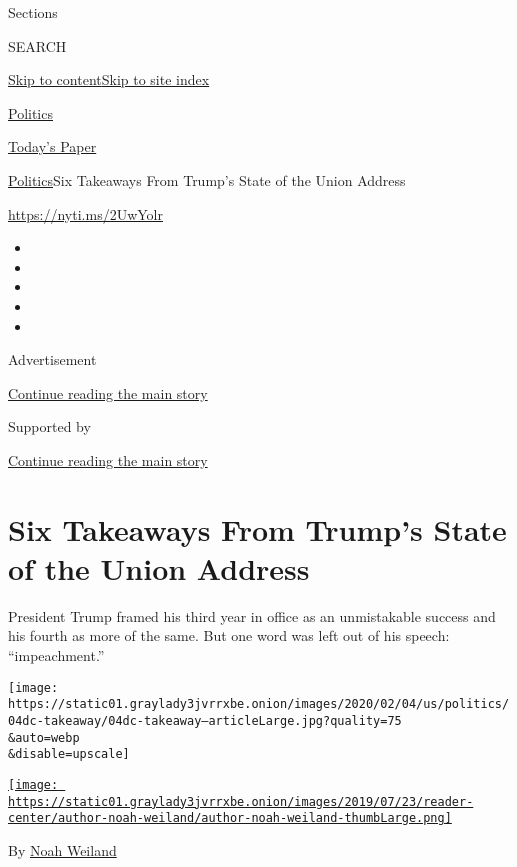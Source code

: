 Sections

SEARCH

\protect\hyperlink{site-content}{Skip to
content}\protect\hyperlink{site-index}{Skip to site index}

\href{https://www.nytimes3xbfgragh.onion/section/politics}{Politics}

\href{https://myaccount.nytimes3xbfgragh.onion/auth/login?response_type=cookie\&client_id=vi}{}

\href{https://www.nytimes3xbfgragh.onion/section/todayspaper}{Today's
Paper}

\href{/section/politics}{Politics}\textbar{}Six Takeaways From Trump's
State of the Union Address

\url{https://nyti.ms/2UwYolr}

\begin{itemize}
\item
\item
\item
\item
\item
\end{itemize}

Advertisement

\protect\hyperlink{after-top}{Continue reading the main story}

Supported by

\protect\hyperlink{after-sponsor}{Continue reading the main story}

\hypertarget{six-takeaways-from-trumps-state-of-the-union-address}{%
\section{Six Takeaways From Trump's State of the Union
Address}\label{six-takeaways-from-trumps-state-of-the-union-address}}

President Trump framed his third year in office as an unmistakable
success and his fourth as more of the same. But one word was left out of
his speech: ``impeachment.''

\texttt{[image: https://static01.graylady3jvrrxbe.onion/images/2020/02/04/us/politics/04dc-takeaway/04dc-takeaway--articleLarge.jpg?quality=75\\\&auto=webp\\\&disable=upscale]}

\href{https://www.nytimes3xbfgragh.onion/by/noah-weiland}{\texttt{[image: https://static01.graylady3jvrrxbe.onion/images/2019/07/23/reader-center/author-noah-weiland/author-noah-weiland-thumbLarge.png]}}

By \href{https://www.nytimes3xbfgragh.onion/by/noah-weiland}{Noah
Weiland}

